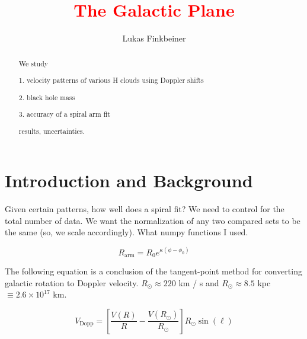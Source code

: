 \documentclass[12pt]{article}
\title{\textcolor{red}{The Galactic Plane}}
\author{Lukas Finkbeiner}
\begin{document}
\maketitle

\begin{abstract}


We study

1. velocity patterns of various H clouds using Doppler shifts

2. black hole mass

3. accuracy of a spiral arm fit

results, uncertainties.

\end{abstract}

\section{Introduction and Background}

Given certain patterns, how well does a spiral fit? We need to control for the total number of data. We want the normalization of any two compared sets to be the same (so, we scale accordingly). What numpy functions I used.

\begin{equation} \label{eq:spiral}
R_\text{arm} = R_0 e^{\kappa(\phi - \phi_0)}
\end{equation}

The following equation is a conclusion of the tangent-point method for converting galactic rotation to Doppler velocity. $R_\odot \approx 220 $ km / s and $R_\odot \approx 8.5$ kpc $\equiv 2.6 \times 10^{17}$ km. 

\begin{equation} \label{eq:vel_dopp}
V_\text{Dopp} = \left[ \frac{V(R)}{R} - \frac{V(R_\odot)}{R_\odot} \right] R_\odot \sin(\ell)
\end{equation}


\end{document}
